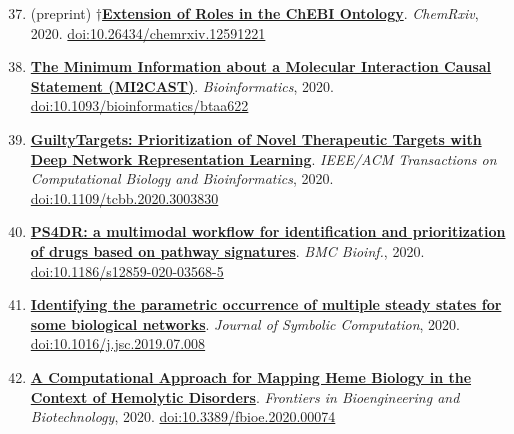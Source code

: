 \documentclass[10pt,a4paper,sans]{moderncv} %
\newcommand{\wikidata}[2]{\href{https://bioregistry.io/wikidata:#1?provider=scholia}{{#2}}}
\begin{document}
    \begin{enumerate}
    \setcounter{enumi}{36}
    \itemsep0.5em
        \item
        (preprint) $\dagger$\wikidata{Q96909013}{\textbf{Extension of Roles in the ChEBI Ontology}}.
    \textit{ChemRxiv}, 2020.  {\scriptsize \href{https://bioregistry.io/doi:10.26434/CHEMRXIV.12591221}{doi:10.26434/chemrxiv.12591221}}
        \item
        \wikidata{Q97063807}{\textbf{The Minimum Information about a Molecular Interaction Causal Statement (MI2CAST)}}.
    \textit{Bioinformatics}, 2020.  {\scriptsize \href{https://bioregistry.io/doi:10.1093/BIOINFORMATICS/BTAA622}{doi:10.1093/bioinformatics/btaa622}}
        \item
        \wikidata{Q98200725}{\textbf{GuiltyTargets: Prioritization of Novel Therapeutic Targets with Deep Network Representation Learning}}.
    \textit{IEEE/ACM Transactions on Computational Biology and Bioinformatics}, 2020.  {\scriptsize \href{https://bioregistry.io/doi:10.1109/TCBB.2020.3003830}{doi:10.1109/tcbb.2020.3003830}}
        \item
        \wikidata{Q96169295}{\textbf{PS4DR: a multimodal workflow for identification and prioritization of drugs based on pathway signatures}}.
    \textit{BMC Bioinf.}, 2020.  {\scriptsize \href{https://bioregistry.io/doi:10.1186/S12859-020-03568-5}{doi:10.1186/s12859-020-03568-5}}
        \item
        \wikidata{Q118952373}{\textbf{Identifying the parametric occurrence of multiple steady states for some biological networks}}.
    \textit{Journal of Symbolic Computation}, 2020.  {\scriptsize \href{https://bioregistry.io/doi:10.1016/J.JSC.2019.07.008}{doi:10.1016/j.jsc.2019.07.008}}
        \item
        \wikidata{Q90643177}{\textbf{A Computational Approach for Mapping Heme Biology in the Context of Hemolytic Disorders}}.
    \textit{Frontiers in Bioengineering and Biotechnology}, 2020.  {\scriptsize \href{https://bioregistry.io/doi:10.3389/FBIOE.2020.00074}{doi:10.3389/fbioe.2020.00074}}
    \end{enumerate}
\end{document}
